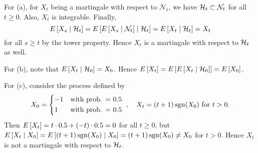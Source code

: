 \begin{solution}
    For (a), for $X_t$ being a martingale with respect to $\mathcal{N}_t$, we have 
    $\mathcal{H}_t\subset \mathcal{N}_t$ for all $t\geq 0$. Also, $X_t$ is integrable. 
    Finally, 
    \begin{equation*}
        E\left[ {X_s\mid \mathcal{H}_t} \right] = E\left[ {E\left[ {X_s\mid \mathcal{N}_t} \right]\mid \mathcal{H}_t} \right] = E\left[ {X_t\mid \mathcal{H}_t} \right] = X_t
    \end{equation*}
    for all $s\geq t$ by the tower property. Hence $X_t$ is a martingale with respect to 
    $\mathcal{H}_t$ as well. 

    For (b), note that $E\left[ {X_t\mid \mathcal{H}_0} \right] = X_0$. Hence $E\left[ {X_t} \right] = E\left[ {E\left[ {X_t\mid \mathcal{H}_0} \right]} \right] = E\left[ {X_0} \right]$. 

    For (c), consider the process defined by 
    \begin{equation*}
        X_0 = \begin{cases*}
            -1 & with prob. = 0.5 \\
            1 & with prob. = 0.5
        \end{cases*}, \quad
        X_t = (t+1)\sgn(X_0) \text{ for } t>0.
    \end{equation*}
    Then $E\left[ {X_t} \right] = t \cdot 0.5 + (-t) \cdot 0.5 = 0$ for all $t \geq 0$, but
    $E\left[ {X_t\mid X_0} \right] = E\left[ {(t+1)\operatorname{sgn}(X_0)\mid X_0} \right] = (t+1)\operatorname{sgn}(X_0) \neq X_0$ for $t>0$. 
    Hence $X_t$ is not a martingale with respect to $\mathcal{H}_t$.
\end{solution}


